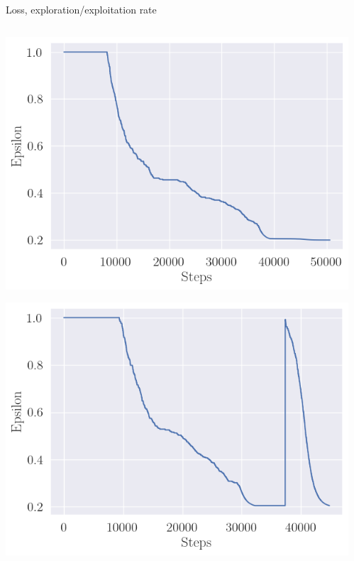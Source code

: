 \documentclass[bigger]{beamer}
\begin{document}
\begin{frame}[label={sec:org23cd4ca}]{Loss, exploration/exploitation rate}
\begin{columns}
\begin{column}{0.5\columnwidth}
\begin{center}
\includegraphics[width=.9\linewidth]{img/exploration-rate_upper-then-lower1.png}
\end{center}
\begin{center}
\includegraphics[width=.9\linewidth]{img/exploration-rate_upper-then-lower2.png}
\end{center}
\end{column}
\begin{column}{0.5\columnwidth}
\begin{center}

\end{center}
\end{column}
\end{columns}
\end{frame}
\end{document}
